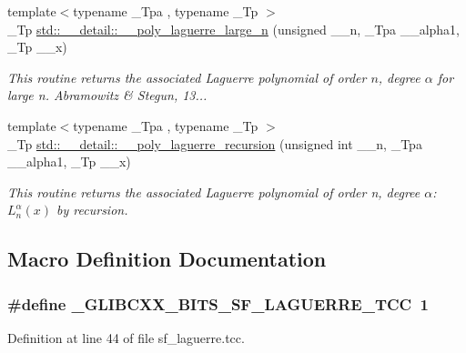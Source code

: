 \begin{DoxyCompactItemize}
{\footnotesize template$<$typename \+\_\+\+Tpa , typename \+\_\+\+Tp $>$ }\\\+\_\+\+Tp \hyperlink{namespacestd_1_1____detail_a1f9e78deb2bcc73511c77dcb1cdcf4c8}{std\+::\+\_\+\+\_\+detail\+::\+\_\+\+\_\+poly\+\_\+laguerre\+\_\+large\+\_\+n} (unsigned \+\_\+\+\_\+n, \+\_\+\+Tpa \+\_\+\+\_\+alpha1, \+\_\+\+Tp \+\_\+\+\_\+x)
\begin{DoxyCompactList}\small\item\em This routine returns the associated Laguerre polynomial of order $ n $, degree $ \alpha $ for large n. Abramowitz \& Stegun, 13... \end{DoxyCompactList}\item 
{\footnotesize template$<$typename \+\_\+\+Tpa , typename \+\_\+\+Tp $>$ }\\\+\_\+\+Tp \hyperlink{namespacestd_1_1____detail_a6d3a7499bd109d5c0ea01e85f3165730}{std\+::\+\_\+\+\_\+detail\+::\+\_\+\+\_\+poly\+\_\+laguerre\+\_\+recursion} (unsigned int \+\_\+\+\_\+n, \+\_\+\+Tpa \+\_\+\+\_\+alpha1, \+\_\+\+Tp \+\_\+\+\_\+x)
\begin{DoxyCompactList}\small\item\em This routine returns the associated Laguerre polynomial of order {\ttfamily n}, degree {\ttfamily $ \alpha $}\+: $ L_n^\alpha(x) $ by recursion. \end{DoxyCompactList}\end{DoxyCompactItemize}


\subsection{Macro Definition Documentation}
\hypertarget{sf__laguerre_8tcc_a6d5a7e97abaa68b4a97764d871fb5314}{}
\subsubsection[{\+\_\+\+G\+L\+I\+B\+C\+X\+X\+\_\+\+B\+I\+T\+S\+\_\+\+S\+F\+\_\+\+L\+A\+G\+U\+E\+R\+R\+E\+\_\+\+T\+C\+C}]{\setlength{\rightskip}{0pt plus 5cm}\#define \+\_\+\+G\+L\+I\+B\+C\+X\+X\+\_\+\+B\+I\+T\+S\+\_\+\+S\+F\+\_\+\+L\+A\+G\+U\+E\+R\+R\+E\+\_\+\+T\+C\+C~1}\label{sf__laguerre_8tcc_a6d5a7e97abaa68b4a97764d871fb5314}


Definition at line 44 of file sf\+\_\+laguerre.\+tcc.

